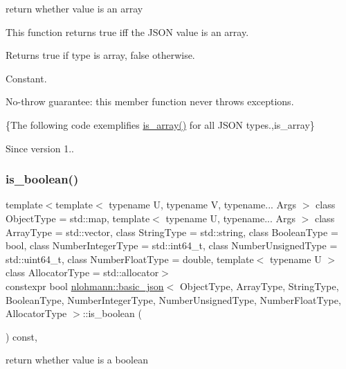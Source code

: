 return whether value is an array 

This function returns true iff the J\+S\+ON value is an array.

\begin{DoxyReturn}{Returns}
{\ttfamily true} if type is array, {\ttfamily false} otherwise.
\end{DoxyReturn}
Constant.

No-\/throw guarantee\+: this member function never throws exceptions.

\{The following code exemplifies {\ttfamily \hyperlink{classnlohmann_1_1basic__json_a256a4cef002023acab3c9d75b569f54a}{is\+\_\+array()}} for all J\+S\+ON types.,is\+\_\+array\}

\begin{DoxySince}{Since}
version 1.. 
\end{DoxySince}
\hypertarget{classnlohmann_1_1basic__json_adade77415e7f7bf08a9b5150c742714d}{}\label{classnlohmann_1_1basic__json_adade77415e7f7bf08a9b5150c742714d} 
\subsubsection{\texorpdfstring{is\+\_\+boolean()}{is\_boolean()}}
{\footnotesize\ttfamily template$<$template$<$ typename U, typename V, typename... Args $>$ class Object\+Type = std\+::map, template$<$ typename U, typename... Args $>$ class Array\+Type = std\+::vector, class String\+Type  = std\+::string, class Boolean\+Type  = bool, class Number\+Integer\+Type  = std\+::int64\+\_\+t, class Number\+Unsigned\+Type  = std\+::uint64\+\_\+t, class Number\+Float\+Type  = double, template$<$ typename U $>$ class Allocator\+Type = std\+::allocator$>$ \\
constexpr bool \hyperlink{classnlohmann_1_1basic__json}{nlohmann\+::basic\+\_\+json}$<$ Object\+Type, Array\+Type, String\+Type, Boolean\+Type, Number\+Integer\+Type, Number\+Unsigned\+Type, Number\+Float\+Type, Allocator\+Type $>$\+::is\+\_\+boolean (\begin{DoxyParamCaption}{ }\end{DoxyParamCaption}) const\hspace{0.3cm}{\ttfamily [inline]}, {\ttfamily [noexcept]}}



return whether value is a boolean 

